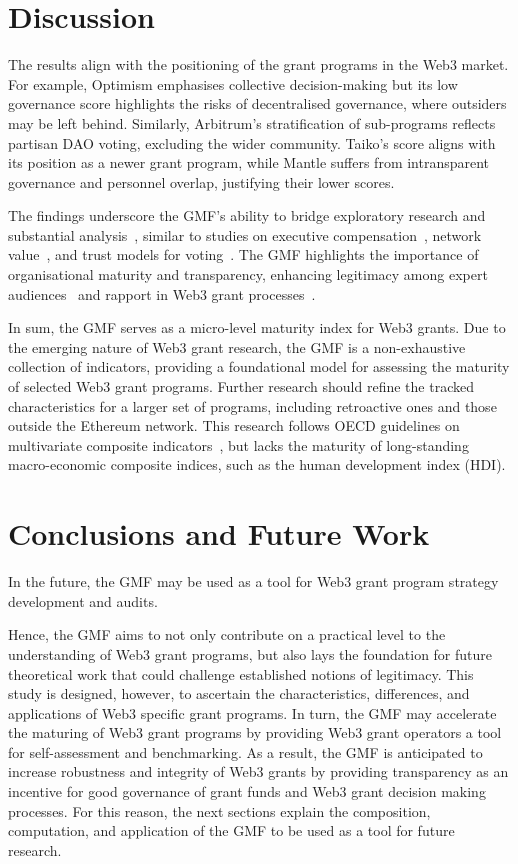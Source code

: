\documentclass[conference]{IEEEtran}
\begin{document}
\section{Discussion}\label{sec_5}

The results align with the positioning of the grant programs in the Web3 market. For example, Optimism emphasises collective decision-making but its low governance score highlights the risks of decentralised governance, where outsiders may be left behind. Similarly, Arbitrum’s stratification of sub-programs reflects partisan DAO voting, excluding the wider community. Taiko’s score aligns with its position as a newer grant program, while Mantle suffers from intransparent governance and personnel overlap, justifying their lower scores.

The findings underscore the GMF’s ability to bridge exploratory research and substantial analysis~\cite{mukumbang_retroductive_2023}, similar to studies on executive compensation~\cite{billett_stockholder_2010}, network value~\cite{papaioannou_business_2023}, and trust models for voting~\cite{baranski_trust-centric_2024,lin_voting_2023}. The GMF highlights the importance of organisational maturity and transparency, enhancing legitimacy among expert audiences~\cite[p.~116]{curtin_does_2006} and rapport in Web3 grant processes~\cite{suddaby_legitimacy_2017}.

In sum, the GMF serves as a micro-level maturity index for Web3 grants. Due to the emerging nature of Web3 grant research, the GMF is a non-exhaustive collection of indicators, providing a foundational model for assessing the maturity of selected Web3 grant programs. Further research should refine the tracked characteristics for a larger set of programs, including retroactive ones and those outside the Ethereum network. This research follows OECD guidelines on multivariate composite indicators~\cite{oecd_handbook_2008}, but lacks the maturity of long-standing macro-economic composite indices, such as the human development index (HDI).


\section{Conclusions and Future Work}\label{sec_6}

In the future, the GMF may be used as a tool for Web3 grant program strategy development and audits.


Hence, the GMF aims to not only contribute on a practical level to the understanding of Web3 grant programs, but also lays the foundation for future theoretical work that could challenge established notions of legitimacy. This study is designed, however, to ascertain the characteristics, differences, and applications of Web3 specific grant programs. In turn, the GMF may accelerate the maturing of Web3 grant programs by providing Web3 grant operators a tool for self-assessment and benchmarking. As a result, the GMF is anticipated to increase robustness and integrity of Web3 grants by providing transparency as an incentive for good governance of grant funds and Web3 grant decision making processes. For this reason, the next sections explain the composition, computation, and application of the GMF to be used as a tool for future research.
\end{document}
